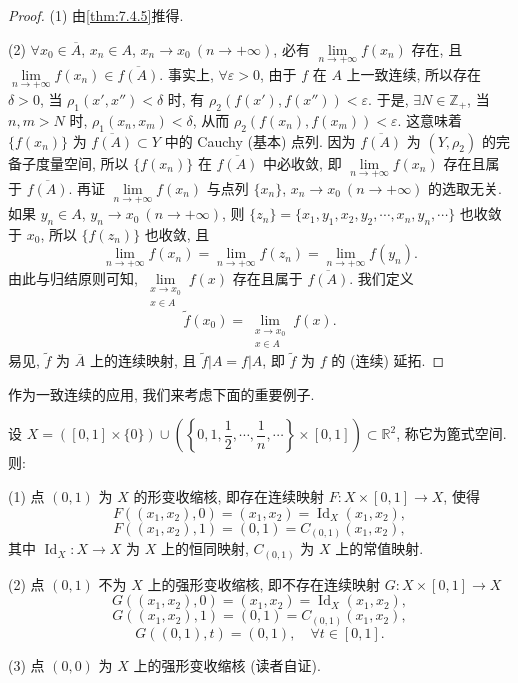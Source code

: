 \begin{proof}
(1) 由\cref{thm:7.4.5}推得.

(2) $\forall x_{0} \in \overline{A}$, $x_{n} \in A$, $x_{n} \to x_{0}\ (n \to +\infty)$, 必有 $\lim\limits_{n \to +\infty} f(x_{n})$ 存在, 且 $\lim\limits_{n \to +\infty} f(x_{n}) \in \overline{f(A)}$. 事实上, $\forall \varepsilon > 0$, 由于 $f$ 在 $A$ 上一致连续, 所以存在 $\delta > 0$, 当 $\rho_{1}(x', x'') < \delta$ 时, 有 $\rho_{2}(f(x'), f(x'')) < \varepsilon$. 于是, $\exists N \in \mathbb{Z}_{+}$, 当 $n, m > N$ 时, $\rho_{1}(x_{n}, x_{m}) < \delta$, 从而 $\rho_{2}(f(x_{n}), f(x_{m})) < \varepsilon$. 这意味着 $\{f(x_{n})\}$ 为 $\overline{f(A)} \subset Y$ 中的 Cauchy (基本) 点列. 因为 $\overline{f(A)}$ 为 $(Y, \rho_{2})$ 的完备子度量空间, 所以 $\{f(x_{n})\}$ 在 $\overline{f(A)}$ 中必收敛, 即 $\lim\limits_{n \to +\infty} f(x_{n})$ 存在且属于 $\overline{f(A)}$. 再证 $\lim\limits_{n \to +\infty} f(x_{n})$ 与点列 $\{x_{n}\}$, $x_{n} \to x_{0}\ (n \to +\infty)$ 的选取无关. 如果 $y_{n} \in A$, $y_{n} \to x_{0}\ (n \to +\infty)$, 则 $\{z_{n}\} = \{x_{1}, y_{1}, x_{2}, y_{2}, \cdots, x_{n}, y_{n}, \cdots\}$ 也收敛于 $x_{0}$, 所以 $\{f(z_{n})\}$ 也收敛, 且
\[
  \lim_{n \to +\infty} f(x_{n}) = \lim_{n \to +\infty} f(z_{n}) = \lim_{n \to +\infty} f(y_{n}).
\]
由此与归结原则可知, $\lim\limits_{\substack{x \to x_{0} \\ x \in A}} f(x)$ 存在且属于 $\overline{f(A)}$. 我们定义
\[
  \tilde{f}(x_{0}) = \lim_{\substack{x \to x_{0} \\ x \in A}} f(x).
\]
易见, $\tilde{f}$ 为 $\overline{A}$ 上的连续映射, 且 $\tilde{f}|A = f|A$, 即 $\tilde{f}$ 为 $f$ 的 (连续) 延拓.
\end{proof}

作为一致连续的应用, 我们来考虑下面的重要例子.

\begin{example}\label{ex:7.4.2}
设 $X = ([0, 1] \times \{0\}) \cup \left(\left\{0, 1, \dfrac{1}{2}, \cdots, \dfrac{1}{n}, \cdots\right\} \times [0, 1]\right) \subset \mathbb{R}^{2}$, 称它为篦式空间. 则:

(1) 点 $(0, 1)$ 为 $X$ 的形变收缩核, 即存在连续映射 $F\colon X \times [0, 1] \to X$, 使得
\[
  F((x_{1}, x_{2}), 0) = (x_{1}, x_{2}) = \operatorname{Id}_{X}(x_{1}, x_{2}),
\]
\[
  F((x_{1}, x_{2}), 1) = (0, 1) = C_{(0, 1)}(x_{1}, x_{2}),
\]
其中 $\operatorname{Id}_{X}\colon X \to X$ 为 $X$ 上的恒同映射, $C_{(0, 1)}$ 为 $X$ 上的常值映射.

(2) 点 $(0, 1)$ 不为 $X$ 上的强形变收缩核, 即不存在连续映射 $G\colon X \times [0, 1] \to X$
\[
  G((x_{1}, x_{2}), 0) = (x_{1}, x_{2}) = \operatorname{Id}_{X}(x_{1}, x_{2}),
\]
\[
  G((x_{1}, x_{2}), 1) = (0, 1) = C_{(0, 1)}(x_{1}, x_{2}),
\]
\[
  G((0, 1), t) = (0, 1),\quad \forall t \in [0, 1].
\]

(3) 点 $(0, 0)$ 为 $X$ 上的强形变收缩核 (读者自证).
\end{example}

